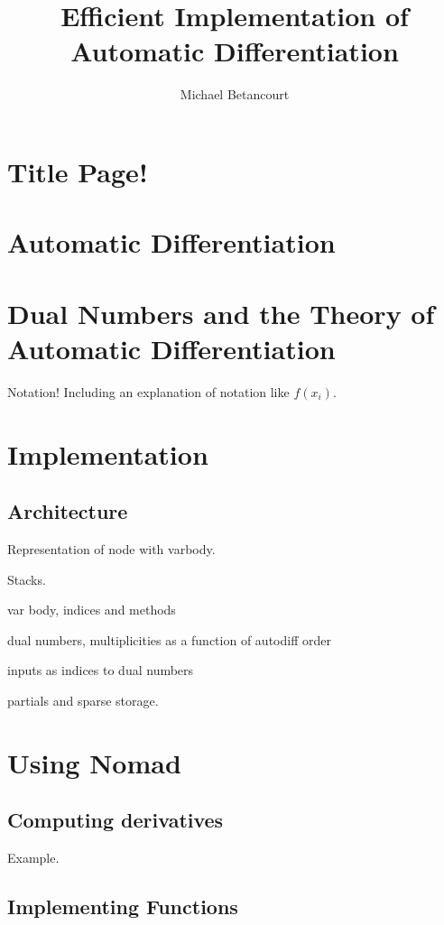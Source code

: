 \documentclass[11pt]{article}
\title{Efficient Implementation of Automatic Differentiation}
\author{Michael Betancourt}
\date{}
\begin{document}
\maketitle

\tableofcontents

\section{Title Page!}

\section{Automatic Differentiation}

\section{Dual Numbers and the Theory of Automatic Differentiation}

Notation!  Including an explanation of notation like $f \! \left( x_{i} \right)$.

\section{Implementation}

\subsection{Architecture}

Representation of node with varbody.

Stacks.

var body, indices and methods

dual numbers, multiplicities as a function of autodiff order

inputs as indices to dual numbers

partials and sparse storage.

\section{Using Nomad}

\subsection{Computing derivatives}

Example.

\subsection{Implementing Functions}
\end{document}
